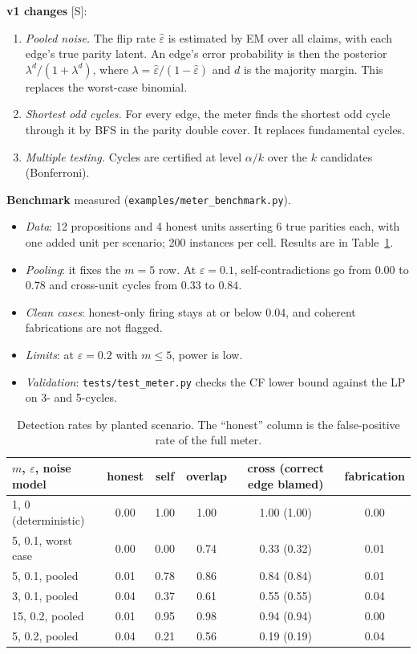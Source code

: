 \documentclass[11pt]{article}
\theoremstyle{definition}
\theoremstyle{remark}
\newcommand{\src}[1]{\textsf{\small[#1]}}
\newcommand{\st}[1]{\textsf{\small\color{gray}#1}}
\begin{document}
\textbf{v1 changes} \src{S}:
\begin{enumerate}
  \item \emph{Pooled noise.} The flip rate $\hat\varepsilon$ is estimated by EM over all claims, with each edge's true parity latent. An edge's error probability is then the posterior $\lambda^{d}/(1+\lambda^{d})$, where $\lambda=\hat\varepsilon/(1-\hat\varepsilon)$ and $d$ is the majority margin. This replaces the worst-case binomial.
  \item \emph{Shortest odd cycles.} For every edge, the meter finds the shortest odd cycle through it by BFS in the parity double cover. It replaces fundamental cycles.
  \item \emph{Multiple testing.} Cycles are certified at level $\alpha/k$ over the $k$ candidates (Bonferroni).
\end{enumerate}

\textbf{Benchmark} \st{measured} (\texttt{examples/meter\_benchmark.py}).
\begin{itemize}
  \item \emph{Data}: 12 propositions and 4 honest units asserting 6 true parities each, with one added unit per scenario; 200 instances per cell. Results are in Table~\ref{tab:meter}.
  \item \emph{Pooling}: it fixes the $m=5$ row. At $\varepsilon=0.1$, self-contradictions go from $0.00$ to $0.78$ and cross-unit cycles from $0.33$ to $0.84$.
  \item \emph{Clean cases}: honest-only firing stays at or below $0.04$, and coherent fabrications are not flagged.
  \item \emph{Limits}: at $\varepsilon=0.2$ with $m\le5$, power is low.
  \item \emph{Validation}: \texttt{tests/test\_meter.py} checks the CF lower bound against the LP on 3- and 5-cycles.
\end{itemize}
\begin{table}[!htbp]\centering\small
\begin{tabular}{lccccc}
\toprule
$m$, $\varepsilon$, noise model & honest & self & overlap & cross (correct edge blamed) & fabrication\\
\midrule
1, 0 (deterministic) & 0.00 & 1.00 & 1.00 & 1.00 (1.00) & 0.00\\
5, 0.1, worst case & 0.00 & 0.00 & 0.74 & 0.33 (0.32) & 0.01\\
5, 0.1, pooled & 0.01 & 0.78 & 0.86 & 0.84 (0.84) & 0.01\\
3, 0.1, pooled & 0.04 & 0.37 & 0.61 & 0.55 (0.55) & 0.04\\
15, 0.2, pooled & 0.01 & 0.95 & 0.98 & 0.94 (0.94) & 0.00\\
5, 0.2, pooled & 0.04 & 0.21 & 0.56 & 0.19 (0.19) & 0.04\\
\bottomrule
\end{tabular}
\caption{Detection rates by planted scenario. The ``honest'' column is the false-positive rate of the full meter.}\label{tab:meter}
\end{table}
\end{document}

